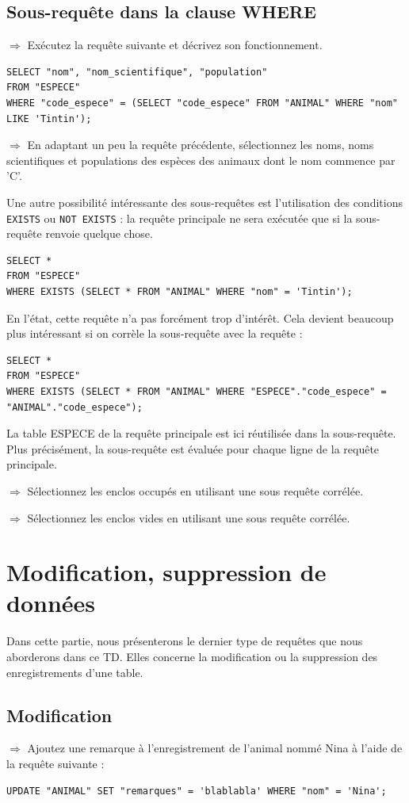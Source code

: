 \documentclass[11pt]{article}
\newcommand{\action}{$\Rightarrow$ }
\begin{document}
\subsection{Sous-requête dans la clause WHERE}
\action Exécutez la requête suivante et décrivez son fonctionnement.
\begin{lstlisting}
SELECT "nom", "nom_scientifique", "population" 
FROM "ESPECE" 
WHERE "code_espece" = (SELECT "code_espece" FROM "ANIMAL" WHERE "nom" LIKE 'Tintin');
\end{lstlisting}

\action En adaptant un peu la requête précédente, sélectionnez les noms, noms scientifiques et populations des espèces des animaux dont le nom commence par 'C'.

Une autre possibilité intéressante des sous-requêtes est l'utilisation des conditions \lstinline{EXISTS} ou \lstinline{NOT EXISTS} : la requête principale ne sera exécutée que si la sous-requête renvoie quelque chose.
\begin{lstlisting}
SELECT * 
FROM "ESPECE" 
WHERE EXISTS (SELECT * FROM "ANIMAL" WHERE "nom" = 'Tintin');
\end{lstlisting}

En l'état, cette requête n'a pas forcément trop d'intérêt. Cela devient beaucoup plus intéressant si on corrèle la sous-requête avec la requête :
\begin{lstlisting}
SELECT * 
FROM "ESPECE" 
WHERE EXISTS (SELECT * FROM "ANIMAL" WHERE "ESPECE"."code_espece" = "ANIMAL"."code_espece");
\end{lstlisting}

La table ESPECE de la requête principale est ici réutilisée dans la sous-requête. Plus précisément, la sous-requête est évaluée pour chaque ligne de la requête principale.

\action Sélectionnez les enclos occupés en utilisant une sous requête corrélée.

\action Sélectionnez les enclos vides en utilisant une sous requête corrélée.



\section{Modification, suppression de données}
Dans cette partie, nous présenterons le dernier type de requêtes que nous aborderons dans ce TD. Elles concerne la modification ou la suppression des enregistrements d'une table.

\subsection{Modification}
\action Ajoutez une remarque à l'enregistrement de l'animal nommé Nina à l'aide de la requête suivante :
\begin{lstlisting}
UPDATE "ANIMAL" SET "remarques" = 'blablabla' WHERE "nom" = 'Nina';
\end{lstlisting}		
\end{document}
